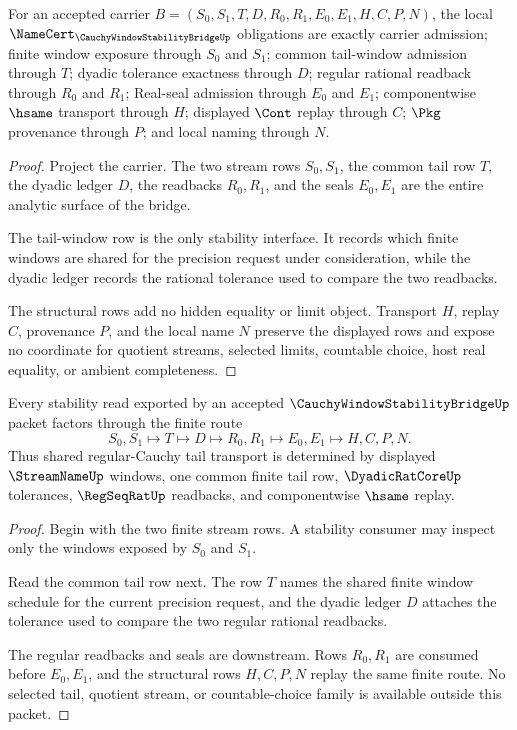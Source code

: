 \begin{theorem}
\label{thm:cauchy-window-stability-bridge-namecert-obligations}
For an accepted carrier $B=(S_0,S_1,T,D,R_0,R_1,E_0,E_1,H,C,P,N)$, the local $\NameCert_{\CauchyWindowStabilityBridgeUp}$ obligations are exactly carrier admission; finite window exposure through $S_0$ and $S_1$; common tail-window admission through $T$; dyadic tolerance exactness through $D$; regular rational readback through $R_0$ and $R_1$; Real-seal admission through $E_0$ and $E_1$; componentwise $\hsame$ transport through $H$; displayed $\Cont$ replay through $C$; $\Pkg$ provenance through $P$; and local naming through $N$.
\end{theorem}
\begin{proof}
Project the carrier. The two stream rows $S_0,S_1$, the common tail row $T$, the dyadic ledger $D$, the readbacks $R_0,R_1$, and the seals $E_0,E_1$ are the entire analytic surface of the bridge.

The tail-window row is the only stability interface. It records which finite windows are shared for the precision request under consideration, while the dyadic ledger records the rational tolerance used to compare the two readbacks.

The structural rows add no hidden equality or limit object. Transport $H$, replay $C$, provenance $P$, and the local name $N$ preserve the displayed rows and expose no coordinate for quotient streams, selected limits, countable choice, host real equality, or ambient completeness.
\end{proof}

\begin{theorem}
\label{thm:cauchy-window-stability-bridge-tail-transport}
Every stability read exported by an accepted $\CauchyWindowStabilityBridgeUp$ packet factors through the finite route
$$
S_0,S_1 \longmapsto T \longmapsto D \longmapsto R_0,R_1 \longmapsto E_0,E_1 \longmapsto H,C,P,N .
$$
Thus shared regular-Cauchy tail transport is determined by displayed $\StreamNameUp$ windows, one common finite tail row, $\DyadicRatCoreUp$ tolerances, $\RegSeqRatUp$ readbacks, and componentwise $\hsame$ replay.
\end{theorem}
\begin{proof}
Begin with the two finite stream rows. A stability consumer may inspect only the windows exposed by $S_0$ and $S_1$.

Read the common tail row next. The row $T$ names the shared finite window schedule for the current precision request, and the dyadic ledger $D$ attaches the tolerance used to compare the two regular rational readbacks.

The regular readbacks and seals are downstream. Rows $R_0,R_1$ are consumed before $E_0,E_1$, and the structural rows $H,C,P,N$ replay the same finite route. No selected tail, quotient stream, or countable-choice family is available outside this packet.
\end{proof}

